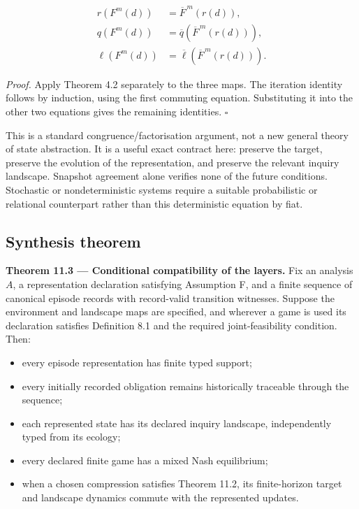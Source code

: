 \documentclass[11pt,a4paper]{article}
\providecommand{\tightlist}{\setlength{\itemsep}{0pt}\setlength{\parskip}{0pt}}
\begin{document}
\[
\begin{aligned}
r(F^m(d))&=\overline F^{\,m}(r(d)),\\
q(F^m(d))&=\overline q(\overline F^{\,m}(r(d))),\\
\ell(F^m(d))&=\overline\ell(\overline F^{\,m}(r(d))).
\end{aligned}
\]

\emph{Proof.} Apply Theorem 4.2 separately to the three maps. The
iteration identity follows by induction, using the first commuting
equation. Substituting it into the other two equations gives the
remaining identities. \(\square\)

This is a standard congruence/factorisation argument, not a new general
theory of state abstraction. It is a useful exact contract here:
preserve the target, preserve the evolution of the representation, and
preserve the relevant inquiry landscape. Snapshot agreement alone
verifies none of the future conditions. Stochastic or nondeterministic
systems require a suitable probabilistic or relational counterpart
rather than this deterministic equation by fiat.

\subsection{Synthesis theorem}\label{synthesis-theorem}


\textbf{Theorem 11.3 --- Conditional compatibility of the layers.} Fix
an analysis \(A\), a representation declaration satisfying Assumption F,
and a finite sequence of canonical episode records with record-valid
transition witnesses. Suppose the environment and landscape maps are
specified, and wherever a game is used its declaration satisfies
Definition 8.1 and the required joint-feasibility condition. Then:

\begin{itemize}
\tightlist
\item
  every episode representation has finite typed support;
\item
  every initially recorded obligation remains historically traceable
  through the sequence;
\item
  each represented state has its declared inquiry landscape,
  independently typed from its ecology;
\item
  every declared finite game has a mixed Nash equilibrium;
\item
  when a chosen compression satisfies Theorem 11.2, its finite-horizon
  target and landscape dynamics commute with the represented updates.
\end{itemize}
\end{document}
